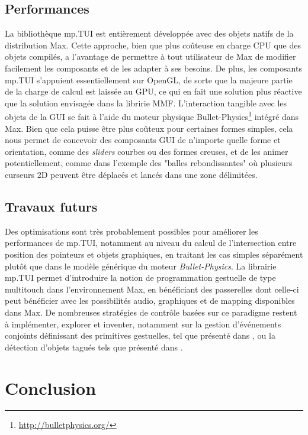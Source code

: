 \subsection{Performances}

\noindent La bibliothèque mp.TUI est entièrement développée avec des objets natifs de la distribution Max. Cette approche, bien que plus coûteuse en charge \gls{CPU} que des objets compilés, a l'avantage de permettre à tout utilisateur de Max de modifier facilement les composants et de les adapter à ses besoins. De plus, les composants mp.TUI s'appuient essentiellement sur OpenGL, de sorte que la majeure partie de la charge de calcul est laissée au \gls{GPU}, ce qui en fait une solution plus réactive que la solution envisagée dans la libririe MMF. L'interaction tangible avec les objets de la \gls{GUI} se fait à l'aide du moteur physique Bullet-Physics\footnote{\url{http://bulletphysics.org/}} intégré dans Max. Bien que cela puisse être plus coûteux pour certaines formes simples, cela nous permet de concevoir des composants \gls{GUI} de n'importe quelle forme et orientation, comme des \textit{sliders} courbes ou des formes creuses, et de les animer potentiellement, comme dans l'exemple des "balles rebondissantes" où plusieurs curseurs 2D peuvent être déplacés et lancés dans une zone délimitées.

\subsection{Travaux futurs}

\noindent Des optimisations sont très probablement possibles pour améliorer les performances de mp.TUI, notamment au niveau du calcul de l'intersection entre position des pointeurs et objets graphiques, en traitant les cas simples séparément plutôt que dans le modèle générique du moteur \textit{Bullet-Physics}.
\noindent La librairie mp.TUI permet d'introduire la notion de programmation gestuelle de type multitouch dans l'environnement Max, en bénéficiant des passerelles dont celle-ci peut bénéficier avec les possibilités audio, graphiques et de mapping disponibles dans Max. De nombreuses stratégies de contrôle basées sur ce paradigme restent à implémenter, explorer et inventer, notamment sur la gestion d'événements conjoints définissant des primitives gestuelles, tel que présenté dans \cite{oney_implementing_2019}, ou la détection d'objets tagués tels que présenté dans \cite{yu_tuic_2011}.


\section{Conclusion}


